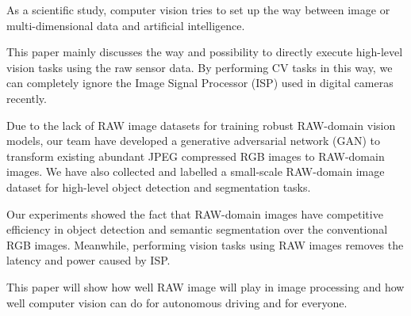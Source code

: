 \documentclass[winfonts]{njuthesis}
\begin{document}
\begin{englishabstract}

As a scientific study, computer vision tries to set up the way between image or multi-dimensional data and artificial intelligence.

This paper mainly discusses the way and possibility to directly execute 
high-level vision tasks using the raw sensor data. By performing CV tasks in this way, we 
can completely ignore the Image Signal Processor (ISP) used in digital cameras recently. 

Due to the lack of RAW image datasets for training robust RAW-domain vision models, 
our team have developed a generative adversarial network (GAN) to transform existing abundant JPEG 
compressed RGB images to RAW-domain images. 
We have also collected and labelled a small-scale RAW-domain image dataset for high-level object detection and segmentation tasks. 

Our experiments showed the fact that RAW-domain images have competitive efficiency in object detection and semantic segmentation over the conventional RGB images. 
Meanwhile, performing vision tasks using RAW images removes the latency and power caused by ISP.

This paper will show how well RAW image will play in image processing and how well computer vision can do for autonomous driving and for everyone.



\end{englishabstract}

%
%
%
%

\tableofcontents
\end{document}
